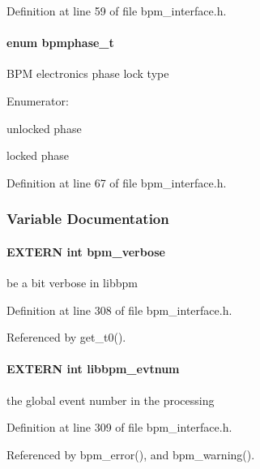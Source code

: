 Definition at line 59 of file bpm\_\-interface.h.
\paragraph[bpmphase\_\-t]{\setlength{\rightskip}{0pt plus 5cm}enum {\bf bpmphase\_\-t}}\hfill\label{group__interface_gb251b13dfcb1736748d78f1fde1507fe}


BPM electronics phase lock type \begin{Desc}
\item[Enumerator: ]\par
\begin{description}
\item[{\em 
randomised\label{group__interface_ggb251b13dfcb1736748d78f1fde1507fefde66f30bebe6599c1f3482b5f018ac5}
}]unlocked phase \item[{\em 
locked\label{group__interface_ggb251b13dfcb1736748d78f1fde1507fe4fea9998d5cce90a5fbfab2a237e8398}
}]locked phase \end{description}
\end{Desc}



Definition at line 67 of file bpm\_\-interface.h.

\subsubsection{Variable Documentation}
\paragraph[bpm\_\-verbose]{\setlength{\rightskip}{0pt plus 5cm}EXTERN int {\bf bpm\_\-verbose}}\hfill\label{group__interface_g0813a2624b730c4664cefd9ba5d49664}


be a bit verbose in libbpm 

Definition at line 308 of file bpm\_\-interface.h.

Referenced by get\_\-t0().
\paragraph[libbpm\_\-evtnum]{\setlength{\rightskip}{0pt plus 5cm}EXTERN int {\bf libbpm\_\-evtnum}}\hfill\label{group__interface_g1ed0ece7cf39a8201736014afa3c7d26}


the global event number in the processing 

Definition at line 309 of file bpm\_\-interface.h.

Referenced by bpm\_\-error(), and bpm\_\-warning().